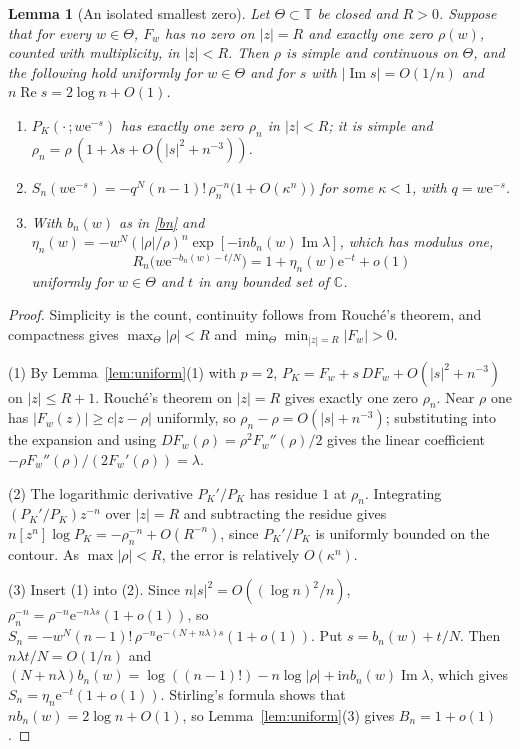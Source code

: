 \documentclass[11pt,a4paper]{article}
\newtheorem{lemma}[theorem]{Lemma}
\theoremstyle{remark}
\newcommand{\coef}[1]{[z^{#1}]}
\newcommand{\T}{\mathbb T}
\newcommand{\e}{\mathrm e}
\newcommand{\ii}{\mathrm i}
\newcommand{\Rea}{\operatorname{Re}}
\newcommand{\Ima}{\operatorname{Im}}
\begin{document}
\begin{lemma}[An isolated smallest zero]\label{lem:isolated}
Let $\Theta\subset\T$ be closed and $R>0$. Suppose that for every $w\in\Theta$, $F_w$ has no zero on $|z|=R$ and exactly one zero $\rho(w)$, counted with multiplicity, in $|z|<R$. Then $\rho$ is simple and continuous on $\Theta$, and the following hold uniformly for $w\in\Theta$ and for $s$ with $|\Ima s|=O(1/n)$ and $n\Rea s=2\log n+O(1)$.
\begin{enumerate}
\item $P_K(\cdot\,;w\e^{-s})$ has exactly one zero $\rho_n$ in $|z|<R$; it is simple and $\rho_n=\rho\,(1+\lambda s+O(|s|^2+n^{-3}))$.
\item $S_n(w\e^{-s})=-q^N(n-1)!\,\rho_n^{-n}\bigl(1+O(\kappa^n)\bigr)$ for some $\kappa<1$, with $q=w\e^{-s}$.
\item With $b_n(w)$ as in \eqref{bn} and $\eta_n(w)=-w^{N}(|\rho|/\rho)^n\exp[-\ii nb_n(w)\Ima\lambda]$, which has modulus one,
\begin{equation}\label{arc}
R_n\bigl(w\e^{-b_n(w)-t/N}\bigr)=1+\eta_n(w)\e^{-t}+o(1)
\end{equation}
uniformly for $w\in\Theta$ and $t$ in any bounded set of $\mathbb C$.
\end{enumerate}
\end{lemma}
\begin{proof}
Simplicity is the count, continuity follows from Rouch\'e's theorem, and compactness gives $\max_\Theta|\rho|<R$ and $\min_\Theta\min_{|z|=R}|F_w|>0$.

(1) By Lemma~\ref{lem:uniform}(1) with $p=2$, $P_K=F_w+s\,DF_w+O(|s|^2+n^{-3})$ on $|z|\le R+1$. Rouch\'e's theorem on $|z|=R$ gives exactly one zero $\rho_n$. Near $\rho$ one has $|F_w(z)|\ge c|z-\rho|$ uniformly, so $\rho_n-\rho=O(|s|+n^{-3})$; substituting into the expansion and using $DF_w(\rho)=\rho^2F_w''(\rho)/2$ gives the linear coefficient $-\rho F_w''(\rho)/(2F_w'(\rho))=\lambda$.

(2) The logarithmic derivative $P_K'/P_K$ has residue $1$ at $\rho_n$. Integrating $(P_K'/P_K)z^{-n}$ over $|z|=R$ and subtracting the residue gives $n\coef n\log P_K=-\rho_n^{-n}+O(R^{-n})$, since $P_K'/P_K$ is uniformly bounded on the contour. As $\max|\rho|<R$, the error is relatively $O(\kappa^n)$.

(3) Insert (1) into (2). Since $n|s|^2=O((\log n)^2/n)$,
$\rho_n^{-n}=\rho^{-n}\e^{-n\lambda s}(1+o(1))$, so $S_n=-w^{N}(n-1)!\,\rho^{-n}\e^{-(N+n\lambda)s}(1+o(1))$. Put $s=b_n(w)+t/N$. Then $n\lambda t/N=O(1/n)$ and $(N+n\lambda)b_n(w)=\log((n-1)!)-n\log|\rho|+\ii nb_n(w)\Ima\lambda$, which gives $S_n=\eta_n\e^{-t}(1+o(1))$. Stirling's formula shows that $nb_n(w)=2\log n+O(1)$, so Lemma~\ref{lem:uniform}(3) gives $B_n=1+o(1)$.
\end{proof}
\end{document}
